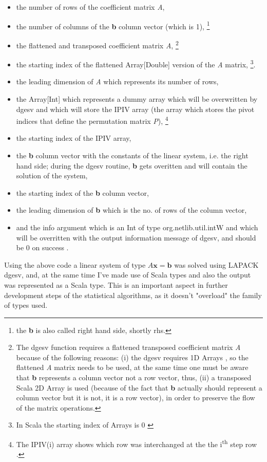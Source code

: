 \documentclass {article}
\begin{document}
\begin{itemize}
\item the number of rows of the coefficient matrix \textit{A}, 
\item the number of columns of the \textbf{b} column vector (which is 1), \footnote{the \textbf{b} is also called right hand side, shortly rhs.} 
\item the flattened and transposed coefficient matrix \textit{A}, \footnote{The dgesv function requires a flattened transposed coefficient matrix \textit{A} because of the following reasons: (i) the dgesv requires 1D Arrays \cite{doolin_jlapack_1999}, so the flattened \textit{A} matrix needs to be used, at the same time one must be aware that \textbf{b} represents a column vector not a row vector, thus, (ii) a transposed Scala 2D Array is used (because of the fact that \textbf{b} actually should represent a column vector but it is not, it is a row vector), in order to preserve the flow of the matrix operations.}   
\item the starting index of the flattened Array[Double] version of the \textit{A} matrix, \footnote{ In Scala the starting index of Arrays is 0 \cite{odersky_programming_2010} \cite{lewis_introduction_2017}}. 
\item the leading dimension of \textit{A} which represents its number of rows, 
\item the Array[Int] which represents a dummy array which will be overwritten by dgesv and which will store the IPIV array (the array which stores the pivot indices that define the permutation matrix \textit{P}), \footnote{The IPIV(i) array shows which row was interchanged at the the i\textsuperscript{th} step row \cite{nag_ltd._nag_nodate}.}  
\item the starting index of the IPIV array,
\item the \textbf{b} column vector with the constants of the linear system, i.e. the right hand side; during the dgesv routine, \textbf{b} gets overitten and will contain the solution of the system,
\item the starting index of the \textbf{b} column vector, 
\item the leading dimension of \textbf{b} which is the no. of rows of the column vector,
\item and the info argument which is an Int of type org.netlib.util.intW and which will be overritten with the output information message of dgesv, and should be 0 on success \cite{nag_ltd._nag_nodate}.
\end{itemize}    
Using the above code a linear system of type $A\textbf{x}=\textbf{b}$ was solved using LAPACK dgesv, and, at the same time I've made use of Scala types and also the output was represented as a Scala type. This is an important aspect in further development steps of the statistical algorithms, as it doesn't "overload" the family of types used.  
\end{document}
